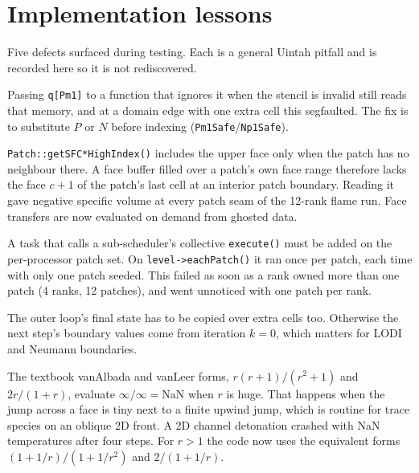 \documentclass[11pt]{article}
\newcommand{\code}[1]{\texttt{\small #1}}
\begin{document}
\section{Implementation lessons}\label{sec:lessons}

Five defects surfaced during testing. Each is a general Uintah pitfall and is recorded
here so it is not rediscovered.

\begin{description}[style=nextline, leftmargin=6mm, font=\sffamily\bfseries\color{Ink}]
  \item[Out-of-range stencil arguments]
        Passing \code{q[Pm1]} to a function that ignores it when the stencil is invalid still
        reads that memory, and at a domain edge with one extra cell this segfaulted. The fix is
        to substitute $P$ or $N$ before indexing (\code{Pm1Safe}/\code{Np1Safe}).
  \item[Patch-sized face buffers]
        \code{Patch::getSFC*HighIndex()} includes the upper face only when the patch has no
        neighbour there. A face buffer filled over a patch's own face range therefore lacks
        the face $c+1$ of the patch's last cell at an interior patch boundary. Reading it gave
        negative specific volume at every patch seam of the 12-rank flame run. Face transfers
        are now evaluated on demand from ghosted data.
  \item[Sub-scheduler driver scheduled per patch]
        A task that calls a sub-scheduler's collective \code{execute()} must be added on the
        per-processor patch set. On \code{level->eachPatch()} it ran once per patch, each time
        with only one patch seeded. This failed as soon as a rank owned more than one patch
        (4 ranks, 12 patches), and went unnoticed with one patch per rank.
  \item[Copy-back over interior cells only]
        The outer loop's final state has to be copied over extra cells too. Otherwise
        the next step's boundary values come from iteration $k=0$, which matters for
        LODI and Neumann boundaries.
  \item[Limiter overflow (found in 2D)]
        The textbook vanAlbada and vanLeer forms, $r(r+1)/(r^2+1)$ and $2r/(1+r)$, evaluate
        $\infty/\infty=\mathrm{NaN}$ when $r$ is huge. That happens when the jump across a face is
        tiny next to a finite upwind jump, which is routine for trace species on an oblique 2D
        front. A 2D channel detonation crashed with NaN temperatures after four steps. For $r>1$
        the code now uses the equivalent forms $(1+1/r)/(1+1/r^2)$ and $2/(1+1/r)$.
\end{description}
\end{document}
